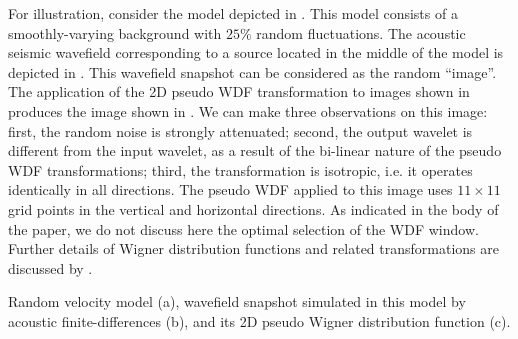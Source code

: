 For illustration, consider the model depicted in . This
model consists of a smoothly-varying background with $25\%$ random
fluctuations. The acoustic seismic wavefield corresponding to a source
located in the middle of the model is depicted in
. This wavefield snapshot can be considered as the
random ``image''. The application of the 2D pseudo WDF transformation
to images shown in  produces the image shown in
. We can make three observations on this image:
first, the random noise is strongly attenuated; second, the output
wavelet is different from the input wavelet, as a result of the
bi-linear nature of the pseudo WDF transformations; third, the
transformation is isotropic, i.e. it operates identically in all
directions.  The pseudo WDF applied to this image uses $11 \times 11$
grid points in the vertical and horizontal directions. As indicated in
the body of the paper, we do not discuss here the optimal selection of
the WDF window. Further details of Wigner distribution functions and
related transformations are discussed by
\cite{Cohen.timefrequencyanalysis}.


{ Random velocity model (a), wavefield snapshot simulated in this
model by acoustic finite-differences (b), and its 2D pseudo Wigner
distribution function (c).}
